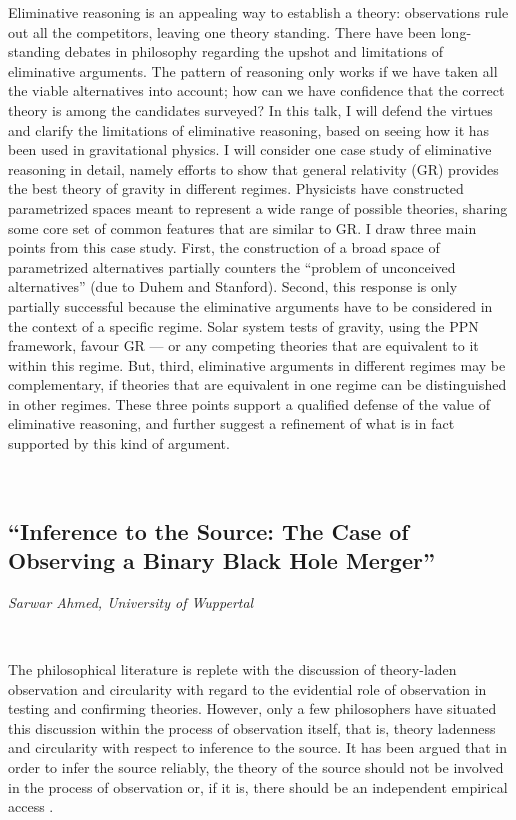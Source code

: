 \documentclass[11pt]{article}
\begin{document}
Eliminative reasoning is an appealing way to establish a theory: observations rule out all the competitors, leaving one theory standing. There have been long-standing debates in philosophy regarding the upshot and limitations of eliminative arguments.  The pattern of reasoning only works if we have taken all the viable alternatives into account; how can we have confidence that the correct theory is among the candidates surveyed? In this talk, I will defend the virtues and clarify the limitations of eliminative reasoning, based on seeing how it has been used in gravitational physics.  I will consider one case study of eliminative reasoning in detail, namely efforts to show that general relativity (GR) provides the best theory of gravity in different regimes.  Physicists have constructed parametrized spaces meant to represent a wide range of possible theories, sharing some core set of common features that are similar to GR.  I draw three main points from this case study.  First, the construction of a broad space of parametrized alternatives partially counters the ``problem of unconceived alternatives'' (due to Duhem and Stanford).  Second, this response is only partially successful because the eliminative arguments have to be considered in the context of a specific regime.  Solar system tests of gravity, using the PPN framework, favour GR — or any competing theories that are equivalent to it within this regime.  But, third, eliminative arguments in different regimes may be complementary, if theories that are equivalent in one regime can be distinguished in other regimes. These three points support a qualified defense of the value of eliminative reasoning, and further suggest a refinement of what is in fact supported by this kind of argument.

\

\newrefsection
\subsection*{\textsf{``Inference to the Source: The Case
of Observing a Binary Black Hole
Merger''}}

\textcolor{moderncvgreen}{
\textit{Sarwar Ahmed, University of Wuppertal
}}

\ 

The philosophical literature is replete with the discussion of theory-laden observation and circularity with regard to the evidential role of observation in testing and confirming theories. However, only a few philosophers have situated this discussion within the process of observation itself, that is, theory ladenness and circularity with respect to inference to the source. It has been argued that in order to infer the source reliably, the theory of the source should not be involved in the process of observation \cite{Hacking1983-HACRAI-7, Kosso1988-KOSDOO} or, if it is, there should be an independent empirical access \cite{Franklin2002-FRASAD-2}.
\end{document}
